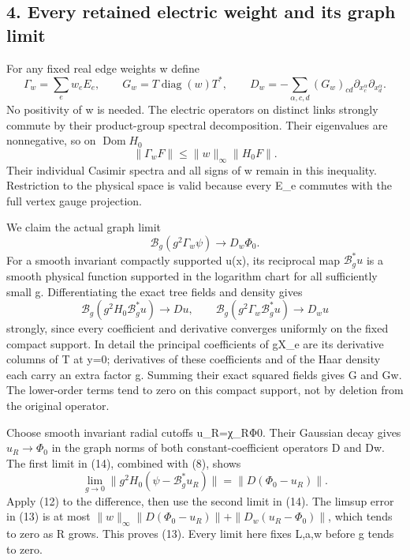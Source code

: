 \documentclass[
  11pt,
]{article}
\begin{document}
\subsection{4. Every retained electric weight and its graph
limit}\label{weak-coupling-part-3-every-retained-electric-weight-and-its-graph-limit}

For any fixed real edge weights w define \[
 \Gamma_w=\sum_e w_eE_e,\qquad
 G_w=T\operatorname{diag}(w)T^*,\qquad
 D_w=-\sum_{\alpha,c,d}(G_w)_{cd}
                        \partial_{x_c^\alpha}\partial_{x_d^\alpha}.
                                                               \tag{11}
\] No positivity of w is needed. The electric operators on distinct
links strongly commute by their product-group spectral decomposition.
Their eigenvalues are nonnegative, so on \(\operatorname{Dom}H_0\) \[
 \|\Gamma_w F\|\le\|w\|_\infty\|H_0F\|.                \tag{12}
\] Their individual Casimir spectra and all signs of w remain in this
inequality. Restriction to the physical space is valid because every
E\_e commutes with the full vertex gauge projection.

We claim the actual graph limit \[
 \boxed{\mathcal B_g(g^2\Gamma_w\psi)\longrightarrow D_w\Phi_0.}
                                                               \tag{13}
\] For a smooth invariant compactly supported u(x), its reciprocal map
\(\mathcal B_g^*u\) is a smooth physical function supported in the
logarithm chart for all sufficiently small g. Differentiating the exact
tree fields and density gives \[
 \mathcal B_g(g^2H_0\mathcal B_g^*u)\to Du,
 \qquad
 \mathcal B_g(g^2\Gamma_w\mathcal B_g^*u)\to D_wu          \tag{14}
\] strongly, since every coefficient and derivative converges uniformly
on the fixed compact support. In detail the principal coefficients of
gX\_e are its derivative columns of T at y=0; derivatives of these
coefficients and of the Haar density each carry an extra factor g.
Summing their exact squared fields gives G and Gw. The lower-order terms
tend to zero on this compact support, not by deletion from the original
operator.

Choose smooth invariant radial cutoffs u\_R=χ\_RΦ0. Their Gaussian decay
gives \(u_R\to\Phi_0\) in the graph norms of both constant-coefficient
operators D and Dw. The first limit in (14), combined with (8), shows \[
 \lim_{g\to0}\|g^2H_0(\psi-\mathcal B_g^*u_R)\|
        =\|D(\Phi_0-u_R)\|.                                \tag{15}
\] Apply (12) to the difference, then use the second limit in (14). The
limsup error in (13) is at most \(\|w\|_\infty\|D(\Phi_0-u_R)\|+
\|D_w(u_R-\Phi_0)\|\), which tends to zero as R grows. This proves (13).
Every limit here fixes L,a,w before g tends to zero.
\end{document}
